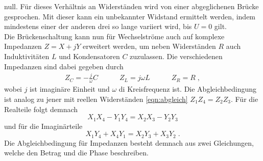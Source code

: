 null. Für dieses Verhältnis an Widerständen wird von einer abgeglichenen Brücke gesprochen. Mit dieser kann ein unbekannter Widstand 
ermittelt werden, indem mindestens einer der anderen drei so lange variiert wird, bis $U=0$ gilt. 
\\\noindent
Die Brückenschaltung kann nun für Wechselströme  auch auf komplexe Impedanzen $Z=X+jY$ erweitert werden, um neben Widerständen $R$ auch 
Induktivitäten $L$ und Kondensatoren $C$ zuzulassen. Die verschiedenen Impedanzen sind dabei gegeben durch
\begin{align*}
    Z_C=-\frac{j}{\omega}C \qquad\quad
    Z_L=j\omega L          \qquad\quad
    Z_R=R \;,
\end{align*}  
wobei $j$ ist imaginäre Einheit und $\omega$ di Kreisfrequenz ist. Die Abgleichbedingung ist analog zu jener mit reellen Widerständen
\eqref{eqn:abgleich} $Z_1Z_4=Z_2Z_3$. Für die Realteile folgt demnach 
\begin{equation*}
    X_1X_4-Y_1Y_4=X_2X_3-Y_2Y_3
\end{equation*}
und für die Imaginärteile
\begin{equation*}
    X_1Y_4+X_4Y_1=X_2Y_3+X_3Y_2 \;.
\end{equation*}
Die Abgleichbedingung für Impedanzen besteht demnach aus zwei Gleichungen, welche den Betrag und die Phase beschreiben.


